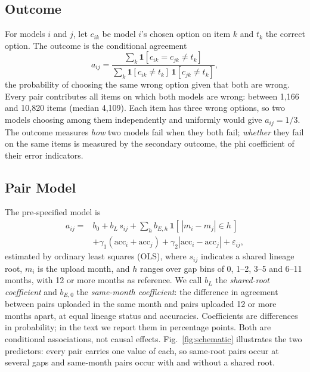 \documentclass{ieeeaccess}
\theoremstyle{definition}
\theoremstyle{plain}
\begin{document}
\subsection{Outcome}
For models $i$ and $j$, let $c_{ik}$ be model $i$'s chosen option on item $k$ and $t_k$ the correct option. The outcome is the conditional agreement~\cite{kim2025}
\begin{equation}
a_{ij} = \frac{\sum_k \mathbf{1}[c_{ik} = c_{jk} \neq t_k]}{\sum_k \mathbf{1}[c_{ik} \neq t_k]\,\mathbf{1}[c_{jk} \neq t_k]},
\label{eq:outcome}
\end{equation}
the probability of choosing the same wrong option given that both are wrong. Every pair contributes all items on which both models are wrong: between 1{,}166 and 10{,}820 items (median 4{,}109). Each item has three wrong options, so two models choosing among them independently and uniformly would give $a_{ij} = 1/3$. The outcome measures \emph{how} two models fail when they both fail; \emph{whether} they fail on the same items is measured by the secondary outcome, the phi coefficient of their error indicators.

\subsection{Pair Model}
The pre-specified model is
\begin{equation}
\begin{aligned}
a_{ij} = {}& b_0 + b_L\, s_{ij} + \textstyle\sum_{h} b_{E,h}\, \mathbf{1}[\,|m_i - m_j| \in h\,]\\
& + \gamma_1 (\mathrm{acc}_i + \mathrm{acc}_j) + \gamma_2 |\mathrm{acc}_i - \mathrm{acc}_j| + \varepsilon_{ij},
\end{aligned}
\label{eq:pair}
\end{equation}
estimated by ordinary least squares (OLS), where $s_{ij}$ indicates a shared lineage root, $m_i$ is the upload month, and $h$ ranges over gap bins of 0, 1--2, 3--5 and 6--11 months, with 12 or more months as reference. We call $b_L$ the \emph{shared-root coefficient} and $b_{E,0}$ the \emph{same-month coefficient}: the difference in agreement between pairs uploaded in the same month and pairs uploaded 12 or more months apart, at equal lineage status and accuracies. Coefficients are differences in probability; in the text we report them in percentage points. Both are conditional associations, not causal effects. Fig.~\ref{fig:schematic} illustrates the two predictors: every pair carries one value of each, so same-root pairs occur at several gaps and same-month pairs occur with and without a shared root.
\end{document}
